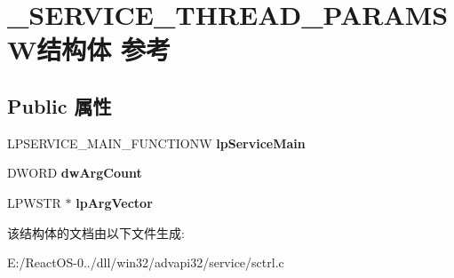 \hypertarget{struct___s_e_r_v_i_c_e___t_h_r_e_a_d___p_a_r_a_m_s_w}{}\section{\+\_\+\+S\+E\+R\+V\+I\+C\+E\+\_\+\+T\+H\+R\+E\+A\+D\+\_\+\+P\+A\+R\+A\+M\+S\+W结构体 参考}
\label{struct___s_e_r_v_i_c_e___t_h_r_e_a_d___p_a_r_a_m_s_w}
\subsection*{Public 属性}
\begin{DoxyCompactItemize}
\item 
\mbox{\label{struct___s_e_r_v_i_c_e___t_h_r_e_a_d___p_a_r_a_m_s_w_a56f72eb06e8dece7d11fce1539ae680e}} 
L\+P\+S\+E\+R\+V\+I\+C\+E\+\_\+\+M\+A\+I\+N\+\_\+\+F\+U\+N\+C\+T\+I\+O\+NW {\bfseries lp\+Service\+Main}
\item 
\mbox{\label{struct___s_e_r_v_i_c_e___t_h_r_e_a_d___p_a_r_a_m_s_w_af0374dc8dc68d8957177da4d128b4d98}} 
D\+W\+O\+RD {\bfseries dw\+Arg\+Count}
\item 
\mbox{\label{struct___s_e_r_v_i_c_e___t_h_r_e_a_d___p_a_r_a_m_s_w_ad471ad02322d9aa8fcd07240b8b3d239}} 
L\+P\+W\+S\+TR $\ast$ {\bfseries lp\+Arg\+Vector}
\end{DoxyCompactItemize}


该结构体的文档由以下文件生成\+:\begin{DoxyCompactItemize}
\item 
E\+:/\+React\+O\+S-\/0../dll/win32/advapi32/service/sctrl.\+c\end{DoxyCompactItemize}
